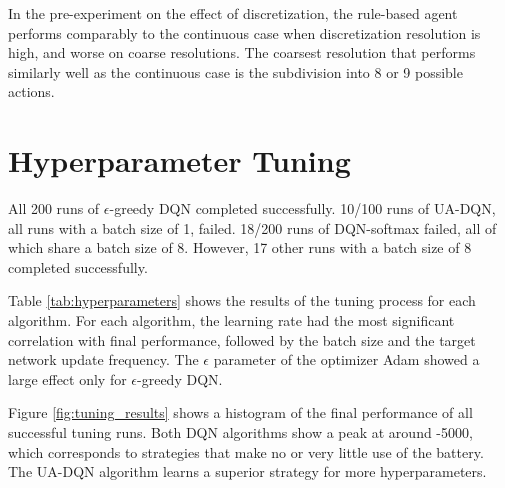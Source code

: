 In the pre-experiment on the effect of discretization, the rule-based agent performs comparably to the continuous case when discretization resolution is high, and worse on coarse resolutions. The coarsest resolution that performs similarly well as the continuous case is the subdivision into 8 or 9 possible actions.




\section{Hyperparameter Tuning}
All 200 runs of $\epsilon$-greedy DQN completed successfully.
10/100 runs of UA-DQN, all runs with a batch size of 1, failed.
18/200 runs of DQN-softmax failed, all of which share a batch size of 8.
However, 17 other runs with a batch size of 8 completed successfully.

Table \ref{tab:hyperparameters} shows the results of the tuning process for each algorithm.
For each algorithm, the learning rate had the most significant correlation with final performance, followed by the batch size and the target network update frequency.
The $\epsilon$ parameter of the optimizer Adam showed a large effect only for $\epsilon$-greedy DQN.

Figure \ref{fig:tuning_results} shows a histogram of the final performance of all successful tuning runs.
Both DQN algorithms show a peak at around -5000, which corresponds to strategies that make no or very little use of the battery.
The UA-DQN algorithm learns a superior strategy for more hyperparameters.


